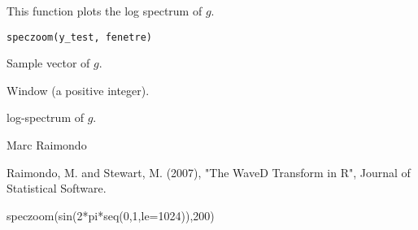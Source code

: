 \begin{Description}\relax
This function plots  the log spectrum of $g$.
\end{Description}
\begin{Usage}
\begin{verbatim}
speczoom(y_test, fenetre)
\end{verbatim}
\end{Usage}
\begin{Arguments}
\begin{ldescription}
\item[\code{y\_test}] Sample vector of $g$.  
\item[\code{fenetre}] Window (a positive integer). 
\end{ldescription}
\end{Arguments}
\begin{Value}
log-spectrum of $g$.
\end{Value}
\begin{Author}\relax
Marc Raimondo
\end{Author}
\begin{References}\relax
Raimondo, M. and Stewart, M. (2007),
"The WaveD Transform in R", Journal of Statistical Software.
\end{References}
\begin{SeeAlso}\relax
{}
\end{SeeAlso}
\begin{Examples}
\begin{ExampleCode}speczoom(sin(2*pi*seq(0,1,le=1024)),200) \end{ExampleCode}
\end{Examples}

